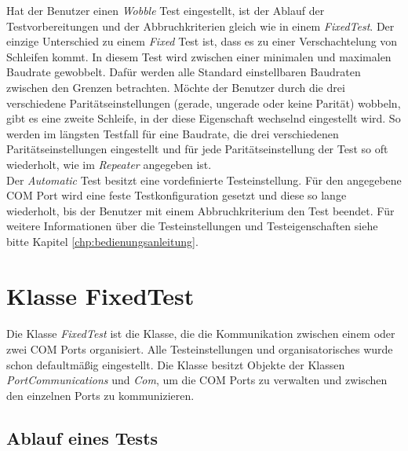 Hat der Benutzer einen \textit{Wobble} Test eingestellt, ist der Ablauf der Testvorbereitungen und der Abbruchkriterien gleich wie in einem \textit{FixedTest}. Der einzige Unterschied zu einem \textit{Fixed} Test ist, dass es zu einer Verschachtelung von Schleifen kommt. In diesem Test wird zwischen einer minimalen und maximalen Baudrate gewobbelt. Dafür werden alle Standard einstellbaren Baudraten zwischen den Grenzen betrachten. Möchte der Benutzer durch die drei verschiedene Paritätseinstellungen (gerade, ungerade oder keine Parität) wobbeln, gibt es eine zweite Schleife, in der diese Eigenschaft wechselnd eingestellt wird. So werden im längsten Testfall für eine  Baudrate, die drei verschiedenen Paritätseinstellungen eingestellt und für jede Paritätseinstellung der Test so oft wiederholt, wie im \textit{Repeater} angegeben ist.\\


Der \textit{Automatic} Test besitzt eine vordefinierte Testeinstellung. Für den angegebene COM Port wird eine feste Testkonfiguration gesetzt und diese so lange wiederholt, bis der Benutzer mit einem Abbruchkriterium den Test beendet. Für weitere Informationen über die Testeinstellungen und Testeigenschaften siehe bitte Kapitel \ref{chp:bedienungsanleitung}.

\newpage


\section{Klasse FixedTest}\label{FixedTextClass}
\paragraph{}
Die Klasse \textit{FixedTest} ist die Klasse, die die Kommunikation zwischen einem oder zwei COM Ports organisiert. Alle Testeinstellungen und organisatorisches wurde schon defaultmäßig eingestellt. Die Klasse besitzt Objekte der Klassen \textit{PortCommunications} und \textit{Com}, um die COM Ports zu verwalten und zwischen den einzelnen Ports zu kommunizieren.\\

\subsection{Ablauf eines Tests}
